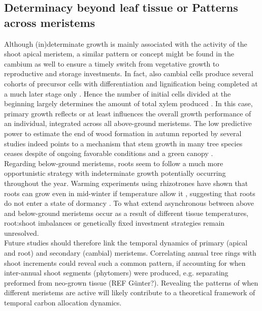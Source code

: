 \documentclass{article}
\begin{document}
\subsection*{Determinacy beyond leaf tissue or Patterns across meristems} %
Although (in)determinate growth is mainly associated with the activity of the shoot apical meristem, a similar pattern or concept might be found in the cambium as well to ensure a timely switch from vegetative growth to reproductive and storage investments. In fact, also cambial cells produce several cohorts of precursor cells with differentiation and lignification being completed at a much later stage only \citep{valdovinos-ayalaSeasonalPatternsIncreases2022}. Hence the number of initial cells divided at the beginning largely determines the amount of total xylem produced \cite{lupiXylemPhenologyWood2010}. In this case, primary growth reflects or at least influences the overall growth performance of an individual, integrated across all above-ground meristems. The low predictive power to estimate the end of wood formation in autumn reported by several studies \cite{buttoComparingCellDynamics2020} indeed points to a mechanism that stem growth in many tree species ceases despite of ongoing favorable conditions and a  green canopy \cite{arendStemGrowthPhenology2024}.\\

Regarding below-ground meristems, roots seem to follow a much more opportunistic strategy with indeterminate growth potentially occurring throughout the year. Warming experiments using rhizotrones have shown that roots can grow even in mid-winter if temperature allow it \cite{lyfordControlledGrowthForest1966}, suggesting that roots do not enter a state of dormancy \cite{radvilleRootPhenologyChanging2016}. To what extend asynchronous between above and below-ground meristems occur as a result of different tissue temperatures, root:shoot imbalances or genetically fixed investment strategies remain unresolved\cite{abramoffAreBelowgroundPhenology2015, makotoSynchronousAsynchronousRoot2020}.\\

 Future studies should therefore link the temporal dynamics of primary (apical and root) and secondary (cambial) meristems. Correlating annual tree rings with shoot increments could reveal such a common pattern, if accounting for when inter-annual shoot segments (phytomers) were produced, e.g. separating preformed from neo-grown tissue (REF Günter?). Revealing the patterns of when different meristems are active will likely contribute to a theoretical framework of temporal carbon allocation dynamics.
\end{document}
